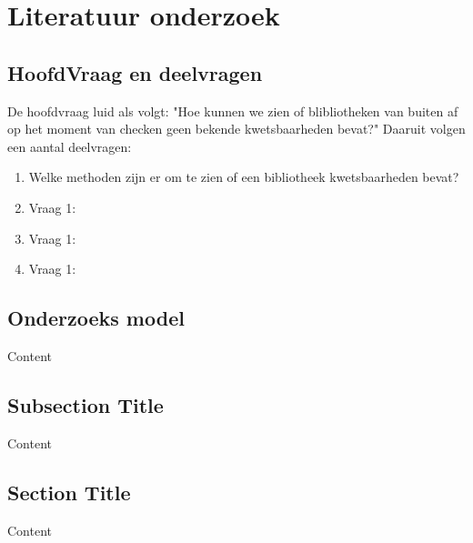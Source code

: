 
\chapter{Literatuur onderzoek} %

\label{ondMarkt} %


\section{HoofdVraag en deelvragen}

De hoofdvraag luid als volgt: "Hoe kunnen we zien of blibliotheken van buiten af op het moment van checken geen bekende kwetsbaarheden bevat?" 
Daaruit volgen een aantal deelvragen:
\begin{enumerate}
\item Welke methoden zijn er om te zien of een bibliotheek kwetsbaarheden bevat?
\item Vraag 1:
\item Vraag 1:
\item Vraag 1:
\end{enumerate}

\section{Onderzoeks model}

Content


\section{Subsection Title}

Content


\section{Section Title}

Content